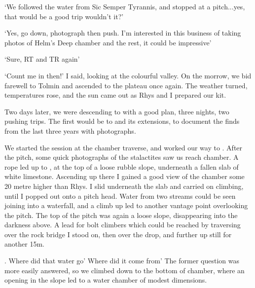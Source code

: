     `We followed the water from Sic Semper Tyrannis, and stopped at a pitch...yes, that would be a good trip wouldn't it?'

    `Yes, go down, photograph then push. I'm interested in this business of taking photos of Helm's Deep chamber and the rest, it could be impressive'

    `Sure, RT and TR again'

    `Count me in then!' I said, looking at the colourful valley. On the morrow, we bid farewell to Tolmin and ascended to the plateau once again. The weather turned, temperatures rose, and the sun came out as Rhys and I prepared our kit.
    
    \mydelimiter

    Two days later, we were descending to  with a good plan, three nights, two pushing trips. The first would be to  and its extensions, to document the finds from the last three years with photographs.

    We started the session at the  chamber traverse, and worked our way to . After the pitch, some quick photographs of the  stalactites saw us reach  chamber. A rope led up to , at the top of a loose rubble slope, underneath a fallen slab of white limestone. Ascending up there I gained a good view of the chamber some 20 metre higher than Rhys. I slid underneath the slab and carried on climbing, until I popped out onto a pitch head. Water from two streams could be seen joining into a waterfall, and a climb up led to another vantage point overlooking the pitch. The top of the pitch was again a loose slope, disappearing into the darkness above. A lead for bolt climbers which could be reached by traversing over the rock bridge I stood on, then over the drop, and further up still for another 15m.

	. Where did that water go' Where did it come from' The former question was more easily answered, so we climbed down to the bottom of  chamber, where an opening in the slope led to a water chamber of modest dimensions.

